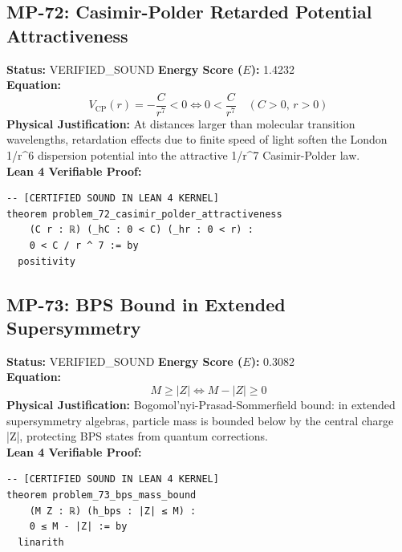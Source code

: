 \documentclass[11pt, a4paper]{article}
\begin{document}
\subsection{MP-72: Casimir-Polder Retarded Potential Attractiveness}
\textbf{Status:} VERIFIED\_SOUND \hfill \textbf{Energy Score ($E$):} 1.4232\\
\textbf{Equation:}
\begin{equation*}
V_{\text{CP}}(r) = -\frac{C}{r^7} < 0 \iff 0 < \frac{C}{r^7} \quad (C > 0, \, r > 0)
\end{equation*}
\textbf{Physical Justification:} At distances larger than molecular transition wavelengths, retardation effects due to finite speed of light soften the London 1/r\textasciicircum{}6 dispersion potential into the attractive 1/r\textasciicircum{}7 Casimir-Polder law.\\
\textbf{Lean 4 Verifiable Proof:}
\begin{verbatim}
-- [CERTIFIED SOUND IN LEAN 4 KERNEL]
theorem problem_72_casimir_polder_attractiveness
    (C r : ℝ) (_hC : 0 < C) (_hr : 0 < r) :
    0 < C / r ^ 7 := by
  positivity

\end{verbatim}

\subsection{MP-73: BPS Bound in Extended Supersymmetry}
\textbf{Status:} VERIFIED\_SOUND \hfill \textbf{Energy Score ($E$):} 0.3082\\
\textbf{Equation:}
\begin{equation*}
M \ge |Z| \iff M - |Z| \ge 0
\end{equation*}
\textbf{Physical Justification:} Bogomol'nyi-Prasad-Sommerfield bound: in extended supersymmetry algebras, particle mass is bounded below by the central charge |Z|, protecting BPS states from quantum corrections.\\
\textbf{Lean 4 Verifiable Proof:}
\begin{verbatim}
-- [CERTIFIED SOUND IN LEAN 4 KERNEL]
theorem problem_73_bps_mass_bound
    (M Z : ℝ) (h_bps : |Z| ≤ M) :
    0 ≤ M - |Z| := by
  linarith

\end{verbatim}
\end{document}
